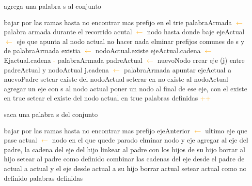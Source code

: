 \begin{algorithm}
\caption{agrega una palabra s al conjunto}
\begin{algorithmic}[1]
\STATE bajar por las ramas hasta no encontrar mas prefijo en el trie
\STATE palabraArmada \textcolor{orange}{$\leftarrow$} palabra armada durante el recorrido
\STATE acutal \textcolor{orange}{$\leftarrow$} nodo hasta donde baje
\STATE ejeActual \textcolor{orange}{$\leftarrow$} eje que apunta al nodo actual
	\STATE no hacer nada
\ELSE
	\STATE elminar prefijos comunes de s y de palabraArmada
		\STATE {} 
		\STATE existia \textcolor{orange}{$\leftarrow$} nodoActual.existe
		\STATE ejeActual.cadena \textcolor{orange}{$\leftarrow$} Ejactual.cadena \textcolor{orange}{-} palabraArmada  
		\STATE padreActual \textcolor{orange}{$\leftarrow$} nuevoNodo 
		\STATE crear eje (j) entre padreActual y nodoActual
		\STATE j.cadena \textcolor{orange}{$\leftarrow$} palabraArmada
		\STATE apuntar ejeActual a nuevoPadre 
			\STATE setear existe del nodoActual
		\ELSE
			\STATE seterar en no existe al nodoActual
		\ENDIF
\ENDIF
\ENDIF
		\STATE agregar un eje con s al nodo actual
		\STATE poner un nodo al final de ese eje, con el existe en true
	\ELSE
		\STATE setear el existe del nodo actual en true
	\ENDIF
\STATE palabras definidas \textcolor{orange}{++}
\end{algorithmic}
\end{algorithm}

\begin{algorithm}
\caption{saca una palabra s del conjunto}
\begin{algorithmic}[1]
\STATE bajar por las ramas hasta no encontrar mas prefijo
\STATE ejeAnterior \textcolor{orange}{$\leftarrow$} ultimo eje que pase
\STATE actual \textcolor{orange}{$\leftarrow$} nodo en el que quede parado
		\STATE elminar nodo y eje
		 \STATE {}
		\STATE agregar al eje del padre, la cadena del eje del hijo
		\STATE linkear al padre con los hijos de su hijo
		\STATE borrar al hijo
		\STATE setear al padre como definido
		\ENDIF
	\ELSE
		\STATE {}
		\STATE combinar las cadenas del eje desde el padre de actual a actual y el eje desde actual a su hijo 
		\STATE borrar actual
		\ELSE
				\STATE {}
				\STATE setear actual como no definido
		\ENDIF
	\ENDIF
	\STATE palabras definidas \textcolor{orange}{--}
\ENDIF
\end{algorithmic}
\end{algorithm}		

